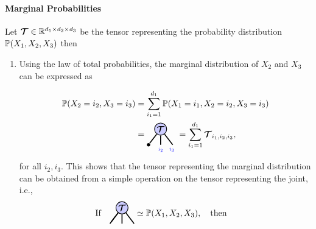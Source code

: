 \paragraph{Marginal Probabilities}
Let  $\bm{\mathcal{T}}\in\mathbb{R}^{d_1\times d_2\times d_3}$ be the tensor representing the probability distribution $\mathbb{P}(X_1, X_2, X_3)$ then 
\begin{enumerate}
    \item Using the law of total probabilities, the marginal distribution of $X_2$ and $X_3$ can be expressed as
    
\begin{align*}
    \PP(X_2=i_2,X_3=i_3) 
    &=
    \sum_{i_1=1}^{d_1}\PP(X_1= i_1,X_2=i_2,X_3=i_3) \\
    &= 
\begin{tikzpicture}[baseline=\baseline]
    \tikzset{tensor/.style = {minimum size = 0.5cm,shape = circle,thick,draw=black,inner sep = 0pt}, edge/.style = {thick,line width=.4mm},every loop/.style={}}
    \def\y{0.25}
    \def\x{0}
    \node[tensor,fill=blue!20!white] (T) at (\x,\y) {$\Tt$};
    \draw  node[fill = black,circle,inner sep=0pt,minimum size=4pt] (m_1) at (\x-0.5,\y-0.65) {};
    \draw[edge] (T) -- (m_1);
    \draw[edge](T) -- (\x,\y-0.65)node [very near end,below]
    {\scalebox{0.7}{\indcolor{$i_2$}}};
    \draw[edge](T) -- (\x+0.5,\y-0.65)node [very near end,below]
    {\scalebox{0.7}{\indcolor{$i_3$}}};
\end{tikzpicture}
 = \sum_{i_1=1}^{d_1}\Tt_{i_1,i_2,i_3},
\end{align*}
for all $i_2,i_3$. This shows that the tensor representing the marginal distribution can be obtained from a simple operation on the tensor representing the joint, i.e.,
\begin{align*}
    \text{If}~~~ \begin{tikzpicture}[baseline=\baseline]
    \tikzset{tensor/.style = {minimum size = 0.5cm,shape = circle,thick,draw=black,inner sep = 0pt}, edge/.style = {thick,line width=.4mm},every loop/.style={}}
    \def\y{0.25}
    \def\x{0}
    \node[tensor,fill=blue!20!white] (T) at (\x,\y) {$\Tt$};
    \draw[edge] (T) -- (\x-0.5,\y-0.65);
    \draw[edge] (T) -- (m_1);
    \draw[edge](T) -- (\x,\y-0.65);
    \draw[edge](T) -- (\x+0.5,\y-0.65);
\end{tikzpicture}\simeq\PP(X_1, X_2, X_3),~~~\text{then}~~~
\begin{tikzpicture}[baseline=\baseline]
    \tikzset{tensor/.style = {minimum size = 0.5cm,shape = circle,thick,draw=black,inner sep = 0pt}, edge/.style = {thick,line width=.4mm},every loop/.style={}}

\end{tikzpicture}
\end{align*}
\end{enumerate}
